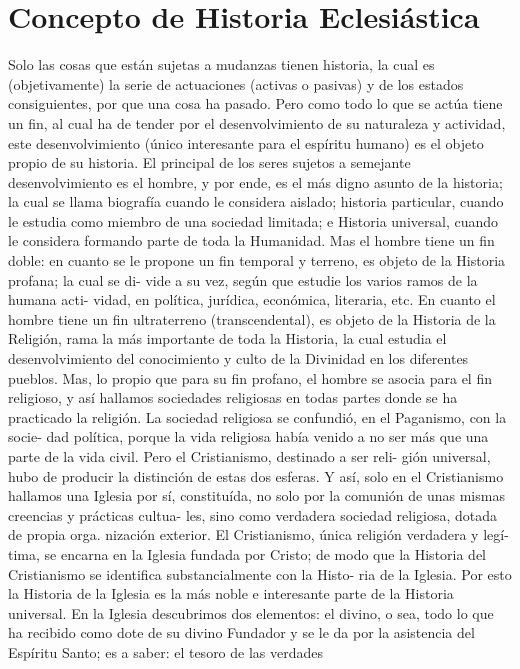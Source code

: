 \raggedbottom{} \documentclass[12pt, a4paper]{book}
\begin{document}
\section{Concepto de Historia Eclesiástica}
Solo las cosas que están sujetas a mudanzas tienen historia, la cual
es (objetivamente) la serie de actuaciones (activas o pasivas) y de los
estados consiguientes, por que una cosa ha pasado. Pero como todo lo
que se actúa tiene un fin, al cual ha de tender por el desenvolvimiento
de su naturaleza y actividad, este desenvolvimiento (único interesante
para el espíritu humano) es el objeto propio de su historia.
El principal de los seres sujetos a semejante desenvolvimiento es
el hombre, y por ende, es el más digno asunto de la historia; la cual
se llama biografía cuando le considera aislado; historia particular,
cuando le estudia como miembro de una sociedad limitada; e Historia
universal, cuando le considera formando parte de toda la Humanidad.
Mas el hombre tiene un fin doble: en cuanto se le propone un fin
temporal y terreno, es objeto de la Historia profana; la cual se di-
vide a su vez, según que estudie los varios ramos de la humana acti-
vidad, en política, jurídica, económica, literaria, etc. En cuanto el
hombre tiene un fin ultraterreno (transcendental), es objeto de la
Historia de la Religión, rama la más importante de toda la Historia,
la cual estudia el desenvolvimiento del conocimiento y culto de la
Divinidad en los diferentes pueblos. Mas, lo propio que para su fin
profano, el hombre se asocia para el fin religioso, y así hallamos
sociedades religiosas en todas partes donde se ha practicado la
religión.
La sociedad religiosa se confundió, en el Paganismo, con la socie-
dad política, porque la vida religiosa había venido a no ser más que
una parte de la vida civil. Pero el Cristianismo, destinado a ser reli-
gión universal, hubo de producir la distinción de estas dos esferas.
Y así, solo en el Cristianismo hallamos una Iglesia por sí, constituída,
no solo por la comunión de unas mismas creencias y prácticas cultua-
les, sino como verdadera sociedad religiosa, dotada de propia orga.
nización exterior. El Cristianismo, única religión verdadera y legí-
tima, se encarna en la Iglesia fundada por Cristo; de modo que la
Historia del Cristianismo se identifica substancialmente con la Histo-
ria de la Iglesia. Por esto la Historia de la Iglesia es la más noble e
interesante parte de la Historia universal.
En la Iglesia descubrimos dos elementos: el divino, o sea, todo lo
que ha recibido como dote de su divino Fundador y se le da por la
asistencia del Espíritu Santo; es a saber: el tesoro de las verdades
\end{document}
